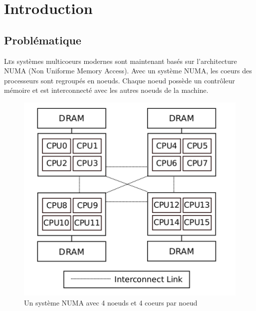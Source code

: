 \pagestyle{plain}

\chapter*{Introduction}
  \section*{Problématique}
    \lettrine[nindent=0em,lines=3]{L} es systèmes multicoeurs modernes sont
    maintenant basés sur l'architecture NUMA (Non Uniforme Memory Access). Avec
    un système NUMA, les coeurs des processeurs sont regroupés en noeuds. Chaque
    noeud possède un contrôleur mémoire et est interconnecté avec les autres
    noeuds de la machine.
    
    \begin{figure}[H]
      \centering
      \includegraphics[scale=0.35]{img/numa_arch.png}
      \caption{Un système NUMA avec 4 noeuds et 4 coeurs par noeud}
      \label{f:numa_arch}
    \end{figure}
    
